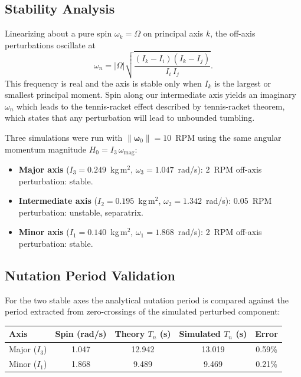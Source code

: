 \documentclass[12pt]{article}
\begin{document}
\subsection{Stability Analysis}

Linearizing about a pure spin $\omega_k = \Omega$ on principal axis $k$,
the off-axis perturbations oscillate at
\[
\omega_n = |\Omega|\sqrt{\frac{(I_k - I_i)(I_k - I_j)}{I_i\,I_j}}.
\]
This frequency is real and the axis is stable only when $I_k$
is the largest or smallest principal moment.
Spin along our intermediate axis yields an imaginary $\omega_n$ which leads to  the tennis-racket effect described by tennis-racket theorem, which states that any perturbation will lead to unbounded tumbling.

Three simulations were run with $\|\boldsymbol\omega_0\| = 10$~RPM
using the same angular momentum magnitude $H_0 = I_3\,\omega_\mathrm{mag}$:

\begin{itemize}
    \item \textbf{Major axis} ($I_3 = 0.249$~kg\,m$^2$, $\omega_3 = 1.047$~rad/s):
          2~RPM off-axis perturbation: stable.
    \item \textbf{Intermediate axis} ($I_2 = 0.195$~kg\,m$^2$, $\omega_2 = 1.342$~rad/s):
          0.05~RPM perturbation: unstable, separatrix.
    \item \textbf{Minor axis} ($I_1 = 0.140$~kg\,m$^2$, $\omega_1 = 1.868$~rad/s):
          2~RPM off-axis perturbation: stable.
\end{itemize}

\subsection{Nutation Period Validation}

For the two stable axes the analytical nutation period is compared against the
period extracted from zero-crossings of the simulated perturbed component:

\begin{center}
\begin{tabular}{lcccc}
\hline
\textbf{Axis} & \textbf{Spin (rad/s)} & \textbf{Theory $T_n$ (s)} & \textbf{Simulated $T_n$ (s)} & \textbf{Error} \\
\hline
Major ($I_3$) & 1.047 & 12.942 & 13.019 & 0.59\% \\
Minor ($I_1$) & 1.868 & \phantom{0}9.489 & \phantom{0}9.469 & 0.21\% \\
\hline
\end{tabular}
\end{center}
\end{document}
